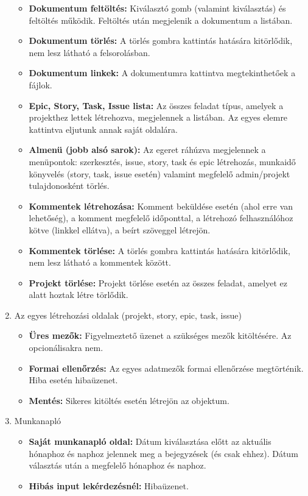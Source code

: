 \begin{enumerate}
\begin{itemize}
		\item \textbf{Dokumentum feltöltés:} Kiválasztó gomb (valamint kiválasztás) és feltöltés működik. Feltöltés után megjelenik a dokumentum a listában.
		\item \textbf{Dokumentum törlés:} A törlés gombra kattintás hatására kitörlődik, nem lesz látható a felsorolásban.
		\item \textbf{Dokumentum linkek:} A dokumentumra kattintva megtekinthetőek a fájlok.
		\item \textbf{Epic, Story, Task, Issue lista:} Az összes feladat típus, amelyek a projekthez lettek létrehozva, megjelennek a listában. Az egyes elemre kattintva eljutunk annak saját oldalára.
		\item \textbf{Almenü (jobb alsó sarok):} Az egeret ráhúzva megjelennek a menüpontok: szerkesztés, issue, story, task és epic létrehozás, munkaidő könyvelés (story, task, issue esetén) valamint megfelelő admin/projekt tulajdonosként törlés.
		\item \textbf{Kommentek létrehozása:} Komment beküldése esetén (ahol erre van lehetőség), a komment megfelelő időponttal, a létrehozó felhasználóhoz kötve (linkkel ellátva), a beírt szöveggel létrejön.
		\item \textbf{Kommentek törlése:} A törlés gombra kattintás hatására kitörlődik, nem lesz látható a kommentek között.
		\item \textbf{Projekt törlése:} Projekt törlése esetén az összes feladat, amelyet ez alatt hoztak létre törlődik.
	\end{itemize} 
	\item Az egyes létrehozási oldalak (projekt, story, epic, task, issue)
	\begin{itemize}
		\item \textbf{Üres mezők:} Figyelmeztető üzenet a szükséges mezők kitöltésére. Az opcionálisakra nem.
		\item \textbf{Formai ellenőrzés:} Az egyes adatmezők formai ellenőrzése megtörténik. Hiba esetén hibaüzenet.
		\item \textbf{Mentés:} Sikeres kitöltés esetén létrejön az objektum.
	\end{itemize}
	\item Munkanapló
	\begin{itemize}
		\item \textbf{Saját munkanapló oldal:} Dátum kiválasztása előtt az aktuális hónaphoz és naphoz jelennek meg a bejegyzések (és csak ehhez). Dátum választás után a megfelelő hónaphoz és naphoz.
		\item \textbf{Hibás input lekérdezésnél:}  Hibaüzenet.

\end{itemize}
\end{enumerate}
